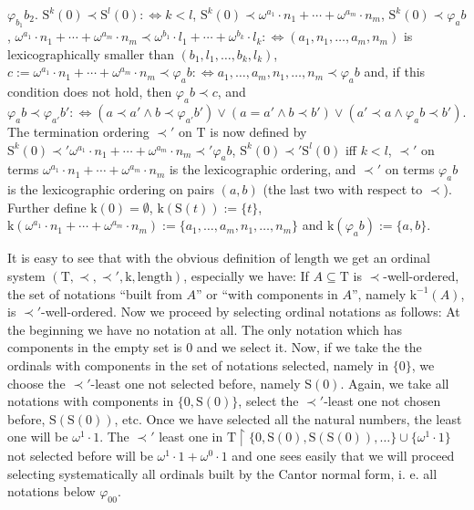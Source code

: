 \documentclass[10pt]{article}
\def \Iff{\Leftrightarrow}
\def\length{\mathrm{length}}
\def\k{\mathrm{k}}
\def\T{\mathrm{T}}
\def\S{\mathrm{S}}
\begin{document}
$\varphi_{b_1}b_2$.  
$\S^k(0) \prec \S^l(0): \Iff k < l$,
$\S^k(0) \prec \omega^{a_1}\cdot n_1 +\cdots+ \omega^{a_m}\cdot n_m$,
$\S^k(0) \prec \varphi_ab$, 
$\omega^{a_1} \cdot n_1 +\cdots+ \omega^{a_m}\cdot n_m 
\prec 
\omega^{b_1} \cdot l_1 +\cdots+ \omega^{b_k}\cdot l_k
:\Iff  (a_1,n_1 ,\ldots, a_m,n_m)$ is lexicographically
smaller than $(b_1,l_1 ,\ldots, b_k,l_k)$,
$c:= \omega^{a_1} \cdot n_1 +\cdots+ \omega^{a_m}\cdot n_m
\prec \varphi_ab :\Iff a_1 ,\ldots, a_m,n_1 ,\ldots, n_m 
\prec \varphi_ab$ and, if this condition does not hold,
then $\varphi_ab \prec c$, 
and $\varphi_ab \prec \varphi_{a'}b' :\Iff 
(a \prec a' \land b \prec \varphi_{a'}b')
\lor (a = a' \land b \prec b') \lor 
(a' \prec  a \land \varphi_ab \prec b')$.
The termination ordering $\prec'$ on $\T$ is now defined by
$\S^k(0) \prec' \omega^{a_1}\cdot n_1 +\cdots+ \omega^{a_m}\cdot n_m 
\prec' \varphi_ab$,
$\S^k(0) \prec ' \S^l(0)$ iff $k<l$, $\prec'$ on terms
$\omega^{a_1}\cdot n_1 +\cdots+ \omega^{a_m}\cdot n_m$ is the 
lexicographic ordering, and $\prec'$ on terms $\varphi_ab$ 
is the lexicographic ordering on pairs $(a,b)$ (the last two with respect
to $\prec$).
Further define $\k(0)= \emptyset$, $\k(\S(t)):= \{ t \}$,
$\k(\omega^{a_1} \cdot n_1 +\cdots+ \omega^{a_m}\cdot n_m):= 
\{ a_1 ,\ldots, a_m,n_1 ,\ldots, n_m \}$
 and $\k(\varphi_ab):= \{ a,b \}$.\par 
It is easy to see that with the obvious definition of
$\length$ we get an ordinal system
$(\T,\prec,\prec ',\k,\length)$, especially
we have: If $A \subseteq \T$ is $\prec$-well-ordered,
the set of notations ``built from $A$'' or ``with components in
$A$'', namely
$\k^{-1}(A)$, is $\prec'$-well-ordered.
Now we proceed by selecting ordinal notations 
as follows: At the beginning we have no
notation at all. The only notation which has components in the empty
set is
$0$ and we select it. Now, if we take the the ordinals with components
in the set of notations selected, namely in $\{ 0 \}$, we choose
the $\prec '$-least
one not selected before, namely $\S(0)$.
Again, we take all notations with
components in $\{ 0,\S(0) \}$, select the $\prec'$-least one not
chosen before,
$\S(\S(0))$, etc. Once we have selected all the natural numbers,
the least one will be $\omega^1 \cdot 1$. The $\prec '$ least one
in $\T \restriction \{ 0,\S(0),\S(\S(0)) ,\ldots \} \cup \{ \omega^1 \cdot 1 \}$
not selected before will be $\omega^1 \cdot 1 + \omega^0 \cdot 1$ and 
one sees easily that we  will proceed selecting
systematically all ordinals built by the Cantor normal form, 
i. e. all notations below $\varphi_00$.\par 
\end{document}
